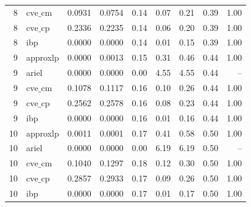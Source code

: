 \documentclass{article}
\begin{document}
\begin{table}[ht]
\begin{tabular}{rlrrrrrrr}
 8 & $\text{cve\_cm}$ & 0.0931 & 0.0754 & 0.14 & 0.07 & 0.21 & 0.39 & 1.00 \\
 8 & $\text{cve\_cp}$ & 0.2336 & 0.2235 & 0.14 & 0.06 & 0.20 & 0.39 & 1.00 \\
 8 & ibp & 0.0000 & 0.0000 & 0.14 & 0.01 & 0.15 & 0.39 & 1.00 \\
\hline
 9 & approxlp & 0.0000 & 0.0013 & 0.15 & 0.31 & 0.46 & 0.44 & 1.00 \\
 9 & ariel & 0.0000 & 0.0000 & 0.00 & 4.55 & 4.55 & 0.44 & -- \\
 9 & $\text{cve\_cm}$ & 0.1078 & 0.1117 & 0.16 & 0.10 & 0.26 & 0.44 & 1.00 \\
 9 & $\text{cve\_cp}$ & 0.2562 & 0.2578 & 0.16 & 0.08 & 0.23 & 0.44 & 1.00 \\
 9 & ibp & 0.0000 & 0.0000 & 0.16 & 0.01 & 0.16 & 0.44 & 1.00 \\
\hline
 10 & approxlp & 0.0011 & 0.0001 & 0.17 & 0.41 & 0.58 & 0.50 & 1.00 \\
 10 & ariel & 0.0000 & 0.0000 & 0.00 & 6.19 & 6.19 & 0.50 & -- \\
 10 & $\text{cve\_cm}$ & 0.1040 & 0.1297 & 0.18 & 0.12 & 0.30 & 0.50 & 1.00 \\
 10 & $\text{cve\_cp}$ & 0.2857 & 0.2933 & 0.17 & 0.09 & 0.26 & 0.50 & 1.00 \\
 10 & ibp & 0.0000 & 0.0000 & 0.17 & 0.01 & 0.17 & 0.50 & 1.00 \\
\bottomrule
\end{tabular}
\end{table}
\end{document}
